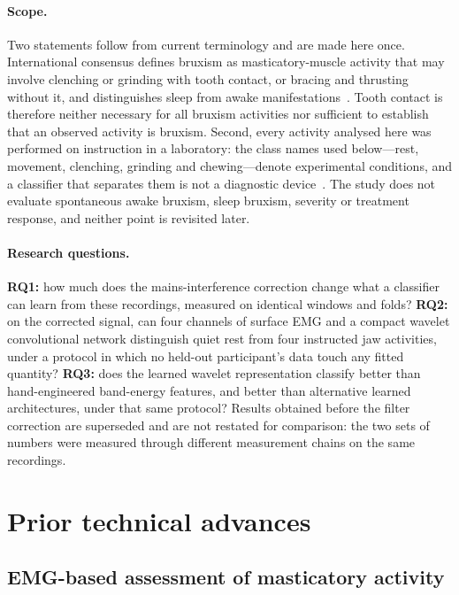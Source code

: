 \documentclass[pdflatex,sn-nature,iicol]{sn-jnl}
\begin{document}
\paragraph{Scope.} Two statements follow from current terminology and are made here once. International consensus defines bruxism as masticatory-muscle activity that may involve clenching or grinding with tooth contact, or bracing and thrusting without it, and distinguishes sleep from awake manifestations~\cite{lobbezoo2013bruxism,lobbezoo2018international,verhoeff2025definitions,manfredini2022bruxism}. Tooth contact is therefore neither necessary for all bruxism activities nor sufficient to establish that an observed activity is bruxism. Second, every activity analysed here was performed on instruction in a laboratory: the class names used below---rest, movement, clenching, grinding and chewing---denote experimental conditions, and a classifier that separates them is not a diagnostic device~\cite{manfredini2024standardised}. The study does not evaluate spontaneous awake bruxism, sleep bruxism, severity or treatment response, and neither point is revisited later.

\paragraph{Research questions.} \textbf{RQ1:} how much does the mains-interference correction change what a classifier can learn from these recordings, measured on identical windows and folds? \textbf{RQ2:} on the corrected signal, can four channels of surface EMG and a compact wavelet convolutional network distinguish quiet rest from four instructed jaw activities, under a protocol in which no held-out participant's data touch any fitted quantity? \textbf{RQ3:} does the learned wavelet representation classify better than hand-engineered band-energy features, and better than alternative learned architectures, under that same protocol? Results obtained before the filter correction are superseded and are not restated for comparison: the two sets of numbers were measured through different measurement chains on the same recordings.

\section{Prior technical advances}

\subsection{EMG-based assessment of masticatory activity}
\end{document}
